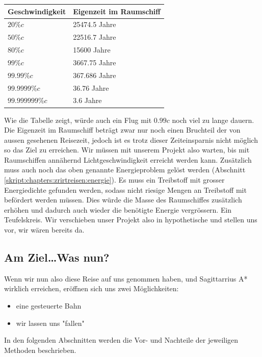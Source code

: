 \begin{refsection}
	\begin{center}
		\begin{tabular}{ | l | p{5cm} |}
			\hline
			Geschwindigkeit & Eigenzeit im Raumschiff \\ \hline
			$20\%c$ & 25474.5 Jahre \\ \hline
			$50\%c$ & 22516.7 Jahre \\ \hline
			$80\%c$ & 15600 Jahre \\ \hline
			$99\%c$ & 3667.75 Jahre \\ \hline
			$99.99\%c$ & 367.686 Jahre \\ \hline
			$99.9999\%c$ & 36.76 Jahre \\ \hline
			$99.999999\%c$ & 3.6 Jahre \\ \hline
		\end{tabular}
	\end{center}
	Wie die Tabelle zeigt, würde auch ein Flug mit $0.99c$ noch viel zu lange dauern. 
	Die Eigenzeit im Raumschiff beträgt zwar nur noch einen Bruchteil der von aussen gesehenen Reisezeit, jedoch ist es trotz dieser Zeiteinsparnis nicht möglich so das Ziel zu erreichen.
	Wir müssen mit unserem Projekt also warten, bis mit Raumschiffen annähernd Lichtgeschwindigkeit erreicht werden kann. Zusätzlich muss auch noch das oben genannte Energieproblem gelöst werden (Abschnitt \ref{skript:chapters:zrirtreisen:energie}). Es muss ein Treibstoff mit grosser Energiedichte gefunden werden, sodass nicht riesige Mengen an Treibstoff mit befördert werden müssen. Dies würde die Masse des Raumschiffes zusätzlich erhöhen und dadurch auch wieder die benötigte Energie vergrössern. Ein Teufelskreis.
	Wir verschieben unser Projekt also in hypothetische und stellen uns vor, wir wären bereits da.
	
	\subsection{Am Ziel\dots Was nun?}
	
	Wenn wir nun also diese Reise auf uns genommen haben, und Sagittarrius A* wirklich erreichen, eröffnen sich uns zwei Möglichkeiten:
	\begin{itemize}
		\item eine gesteuerte Bahn
		\item wir lassen uns "fallen"
	\end{itemize}
	In den folgenden Abschnitten werden die Vor- und Nachteile der jeweiligen Methoden beschrieben.
	

\end{refsection}
